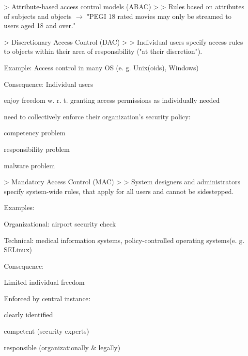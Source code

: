 \documentclass[a4paper]{article}
\begin{document}
\begin{multicols}{3}
    > Attribute-based access control models (ABAC)
    >
    > Rules based on attributes of subjects and objects $\rightarrow$  "PEGI 18 rated movies may only be streamed to users aged 18 and over."

    > Discretionary Access Control (DAC)
    >
    > Individual users specify access rules to objects within their area of responsibility ("at their discretion").

    Example: Access control in many OS (e. g. Unix(oids), Windows)

    Consequence: Individual users
    \begin{itemize*}
        \item enjoy freedom w. r. t. granting access permissions as individually needed
        \item need to collectively enforce their organization’s security policy:
              \begin{itemize*}
                  \item competency problem
                  \item responsibility problem
                  \item malware problem
              \end{itemize*}
    \end{itemize*}

    > Mandatory Access Control (MAC)
    >
    > System designers and administrators specify system-wide rules, that apply for all users and cannot be sidestepped.

    Examples:
    \begin{itemize*}
        \item Organizational: airport security check
        \item Technical: medical information systems, policy-controlled operating systems(e. g. SELinux)
    \end{itemize*}

    Consequence:
    \begin{itemize*}
        \item Limited individual freedom
        \item Enforced by central instance:
              \begin{itemize*}
                  \item clearly identified
                  \item competent (security experts)
                  \item responsible (organizationally \& legally)
              \end{itemize*}
    \end{itemize*}


\end{multicols}
\end{document}
